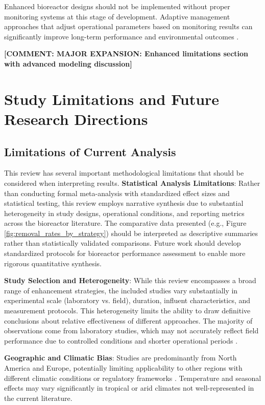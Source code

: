 \documentclass[12pt,a4paper]{article}
\newcommand{\comment}[1]{\textcolor{commenttext}{\textbf{[COMMENT: #1]}}}
\begin{document}
Enhanced bioreactor designs should not be implemented without proper monitoring systems at this stage of development. Adaptive management approaches that adjust operational parameters based on monitoring results can significantly improve long-term performance and environmental outcomes \citep{RN310}.

\comment{MAJOR EXPANSION: Enhanced limitations section with advanced modeling discussion}

\section{Study Limitations and Future Research Directions}

\subsection{Limitations of Current Analysis}

This review has several important methodological limitations that should be considered when interpreting results. \textbf{Statistical Analysis Limitations}: Rather than conducting formal meta-analysis with standardized effect sizes and statistical testing, this review employs narrative synthesis due to substantial heterogeneity in study designs, operational conditions, and reporting metrics across the bioreactor literature. The comparative data presented (e.g., Figure \ref{fig:removal_rates_by_strategy}) should be interpreted as descriptive summaries rather than statistically validated comparisons. Future work should develop standardized protocols for bioreactor performance assessment to enable more rigorous quantitative synthesis.

\textbf{Study Selection and Heterogeneity}: While this review encompasses a broad range of enhancement strategies, the included studies vary substantially in experimental scale (laboratory vs. field), duration, influent characteristics, and measurement protocols. This heterogeneity limits the ability to draw definitive conclusions about relative effectiveness of different approaches. The majority of observations come from laboratory studies, which may not accurately reflect field performance due to controlled conditions and shorter operational periods \citep{RN312}.

\textbf{Geographic and Climatic Bias}: Studies are predominantly from North America and Europe, potentially limiting applicability to other regions with different climatic conditions or regulatory frameworks \citep{RN1023, RN258}. Temperature and seasonal effects may vary significantly in tropical or arid climates not well-represented in the current literature.
\end{document}
